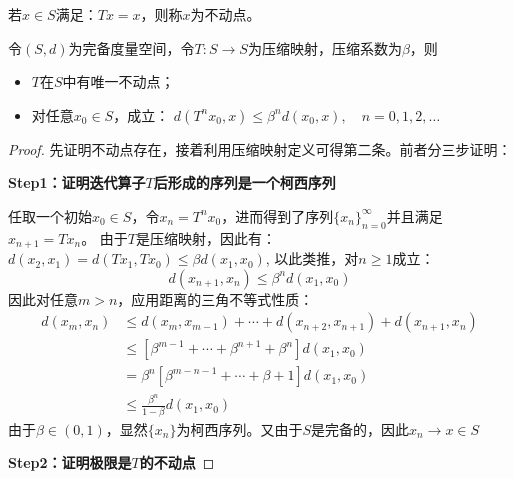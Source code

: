 \begin{definition}
    若$x \in S$满足：$Tx=x$，则称$x$为不动点。
\end{definition}

\begin{theorem}   \label{th-cmt}
    令$\left(S,d\right)$为完备度量空间，令$T:S\rightarrow S$为压缩映射，压缩系数为$\beta$，则
    \begin{itemize}
        \item $T$在$S$中有唯一不动点；
        \item 对任意$x_0 \in S$，成立：
            $d\left(T^nx_0, x\right) \leq \beta^n d\left(x_0,x\right), \quad n=0,1,2,\dots$
    \end{itemize}
\end{theorem}
\begin{proof}
    先证明不动点存在，接着利用压缩映射定义可得第二条。前者分三步证明：

    \textbf{Step1：证明迭代算子$T$后形成的序列是一个柯西序列}

    任取一个初始$x_0 \in S$，令$x_n=T^n x_0$，进而得到了序列$\{x_n\}_{n=0}^{\infty}$并且满足$x_{n+1}=Tx_n$。
    由于$T$是压缩映射，因此有：$d\left(x_2, x_1\right)=d\left(T x_1, T x_0\right) \leq \beta d\left(x_1, x_0\right)$,
    以此类推，对$n\geq 1$成立：
    \begin{equation*}
        d\left(x_{n+1}, x_n\right) \leq \beta^n d\left(x_1, x_0\right)
    \end{equation*}
    因此对任意$m>n$，应用距离的三角不等式性质：
    \begin{equation*}
        \begin{aligned}
            d\left(x_m, x_n\right) & \leq d\left(x_m, x_{m-1}\right) + 
                \cdots+d\left(x_{n+2}, x_{n+1}\right)+d\left(x_{n+1}, x_n\right) \\
            & \leq\left[\beta^{m-1}+\cdots+\beta^{n+1}+\beta^n\right] d\left(x_1, x_0\right) \\
            & =\beta^n\left[\beta^{m-n-1}+\cdots+\beta+1\right] d\left(x_1, x_0\right) \\
            & \leq \frac{\beta^n}{1-\beta} d\left(x_1, x_0\right)
        \end{aligned}
    \end{equation*}
    由于$\beta \in \left(0,1\right)$，显然$\{x_n\}$为柯西序列。又由于$S$是完备的，因此$x_n\rightarrow x \in S$

    \textbf{Step2：证明极限是$T$的不动点}


\end{proof}
